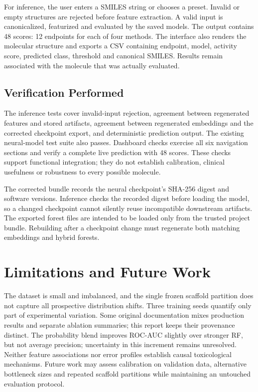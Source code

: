 \documentclass[conference]{IEEEtran}
\begin{document}
For inference, the user enters a SMILES string or chooses a preset. Invalid or empty structures are rejected before feature extraction. A valid input is canonicalized, featurized and evaluated by the saved models. The output contains 48 scores: 12 endpoints for each of four methods. The interface also renders the molecular structure and exports a CSV containing endpoint, model, activity score, predicted class, threshold and canonical SMILES. Results remain associated with the molecule that was actually evaluated.

\subsection{Verification Performed}
The inference tests cover invalid-input rejection, agreement between regenerated features and stored artifacts, agreement between regenerated embeddings and the corrected checkpoint export, and deterministic prediction output. The existing neural-model test suite also passes. Dashboard checks exercise all six navigation sections and verify a complete live prediction with 48 scores. These checks support functional integration; they do not establish calibration, clinical usefulness or robustness to every possible molecule.

The corrected bundle records the neural checkpoint's SHA-256 digest and software versions. Inference checks the recorded digest before loading the model, so a changed checkpoint cannot silently reuse incompatible downstream artifacts. The exported forest files are intended to be loaded only from the trusted project bundle. Rebuilding after a checkpoint change must regenerate both matching embeddings and hybrid forests.


\section{Limitations and Future Work}
The dataset is small and imbalanced, and the single frozen scaffold partition does not capture all prospective distribution shifts. Three training seeds quantify only part of experimental variation. Some original documentation mixes production results and separate ablation summaries; this report keeps their provenance distinct. The probability blend improves ROC-AUC slightly over stronger RF, but not average precision; uncertainty in this increment remains unresolved. Neither feature associations nor error profiles establish causal toxicological mechanisms. Future work may assess calibration on validation data, alternative bottleneck sizes and repeated scaffold partitions while maintaining an untouched evaluation protocol.
\end{document}
